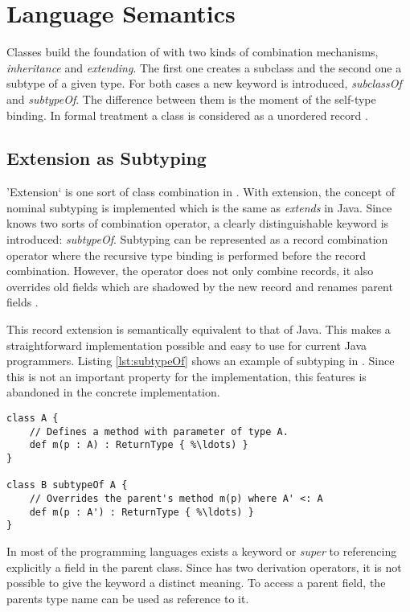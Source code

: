 \section{Language Semantics}
Classes build the foundation of \ooplss with two kinds of combination
mechanisms, \emph{inheritance} and \emph{extending}. The first
one creates a subclass and the second one a subtype of a given
type. For both cases a new keyword is introduced, \emph{subclassOf}
and \emph{subtypeOf}. The difference between them is the moment of
the self-type binding. In formal treatment a class is considered as a
unordered record \cite{simons_theory_2002-1}.

\subsection{Extension as Subtyping}
'Extension` is one sort of class combination in \ooplss. With extension,
the concept of nominal subtyping is implemented which is the same as
\emph{extends} in Java. Since \ooplss knows two sorts of combination operator, a
clearly distinguishable keyword is introduced: \emph{subtypeOf}. Subtyping
can be represented as a record combination operator where the recursive type binding
is performed before the record combination. However, the operator does
not only combine records, it also overrides old fields which are shadowed
by the new record and renames parent fields \cite{simons_theory_2003-2}.

This record extension is semantically equivalent to that of Java. This
makes a straightforward implementation possible and easy to use for
current Java programmers. Listing \ref{lst:subtypeOf} shows an example
of subtyping in \ooplss. Since this is not an important property for the
implementation, this features is abandoned in the concrete implementation.

\begin{lstlisting}[float=ht,language=ooplss,caption=Subtyping in \ooplss,label=lst:subtypeOf]
class A {
	// Defines a method with parameter of type A.
	def m(p : A) : ReturnType { %\ldots) }
}

class B subtypeOf A {
	// Overrides the parent's method m(p) where A' <: A
	def m(p : A') : ReturnType { %\ldots) }
}
\end{lstlisting}

In most of the programming languages exists a keyword \base or
\emph{super} to referencing explicitly a field in the parent class. Since
\ooplss has two derivation operators, it is not possible to give the
keyword a distinct meaning. To access a parent field, the parents type
name can be used as reference to it.

